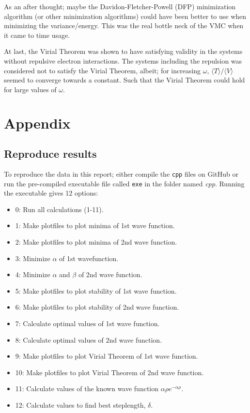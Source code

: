\documentclass[12pt,english,a4paper]{article}
\begin{document}
As an after thought; maybe the Davidon-Fletcher-Powell (DFP) minimization algorithm (or other minimization algorithms) could have been better to use when minimizing the variance/energy. This was the real bottle neck of the VMC when it came to time usage. 

At last, the Virial Theorem was shown to have satisfying validity in the systems without repulsive electron interactions. The systems including the repulsion was considered not to satisfy the Virial Theorem, albeit; for increasing $\omega$, $\langle T\rangle/\langle V\rangle$ seemed to converge towards a constant. Such that the Virial Theorem could hold for large values of $\omega$. 

\newpage

\section{Appendix} \label{section:appendix}
\subsection{Reproduce results} \label{section:appendix:reproduce}
To reproduce the data in this report; either compile the \texttt{cpp} files on GitHub or run the pre-compiled executable file called \texttt{exe} in the folder named \textit{cpp}. Running the executable gives 12 options:
\begin{itemize}
    \renewcommand\labelitemi{--}
    \item 0: Run all calculations (1-11).
    \item 1: Make plotfiles to plot minima of 1st wave function.
    \item 2: Make plotfiles to plot minima of 2nd wave function.
    \item 3: Minimize $\alpha$ of 1st wavefunction.
    \item 4: Minimize $\alpha$ and $\beta$ of 2nd wave function.
    \item 5: Make plotfiles to plot stability of 1st wave function.
    \item 6: Make plotfiles to plot stability of 2nd wave function.
    \item 7: Calculate optimal values of 1st wave function.
    \item 8: Calculate optimal values of 2nd wave function.
    \item 9: Make plotfiles to plot Virial Theorem of 1st wave function.
    \item 10: Make plotfiles to plot Virial Theorem of 2nd wave function.
    \item 11: Calculate values of the known wave function $\alpha\rho e^{-\alpha\rho}$.
    \item 12: Calculate values to find best steplength, $\delta$.
\end{itemize}
\end{document}

